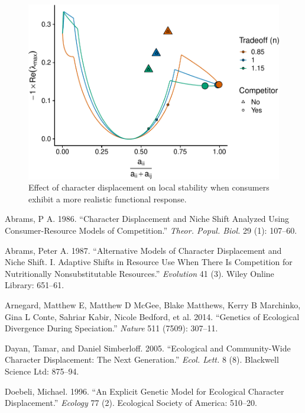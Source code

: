 \documentclass[11pt,]{article}
\begin{document}
\begin{figure}
\centering
\includegraphics{ECD_Supp_Mat_files/figure-latex/Stability_McCann-1.pdf}
\caption{\label{fig:Stability_McCann}Effect of character displacement on
local stability when consumers exhibit a more realistic functional
response.}
\end{figure}

\hypertarget{refs}{}
\hypertarget{ref-Abrams1986}{}
Abrams, P A. 1986. ``Character Displacement and Niche Shift Analyzed
Using Consumer-Resource Models of Competition.'' \emph{Theor. Popul.
Biol.} 29 (1): 107--60.

\hypertarget{ref-Abrams1987}{}
Abrams, Peter A. 1987. ``Alternative Models of Character Displacement
and Niche Shift. I. Adaptive Shifts in Resource Use When There Is
Competition for Nutritionally Nonsubstitutable Resources.''
\emph{Evolution} 41 (3). Wiley Online Library: 651--61.

\hypertarget{ref-Arnegard2014}{}
Arnegard, Matthew E, Matthew D McGee, Blake Matthews, Kerry B Marchinko,
Gina L Conte, Sahriar Kabir, Nicole Bedford, et al. 2014. ``Genetics of
Ecological Divergence During Speciation.'' \emph{Nature} 511 (7509):
307--11.

\hypertarget{ref-Dayan2005}{}
Dayan, Tamar, and Daniel Simberloff. 2005. ``Ecological and
Community-Wide Character Displacement: The Next Generation.''
\emph{Ecol. Lett.} 8 (8). Blackwell Science Ltd: 875--94.

\hypertarget{ref-Doebeli1996}{}
Doebeli, Michael. 1996. ``An Explicit Genetic Model for Ecological
Character Displacement.'' \emph{Ecology} 77 (2). Ecological Society of
America: 510--20.
\end{document}
